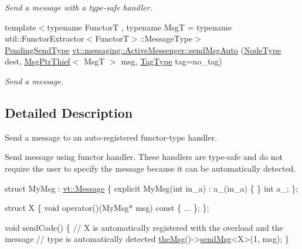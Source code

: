 \begin{DoxyCompactItemize}
\begin{DoxyCompactList}\small\item\em Send a message with a type-\/safe handler. \end{DoxyCompactList}\item 
{\footnotesize template$<$typename FunctorT , typename MsgT  = typename util\+::\+Functor\+Extractor$<$\+Functor\+T$>$\+::\+Message\+Type$>$ }\\\hyperlink{structvt_1_1messaging_1_1_active_messenger_a3626a6ca76d8ad4ec7c3b47a2c70d3a8}{Pending\+Send\+Type} \hyperlink{group__functorsend_ga902007cdc61f7c93e694b7c4c89d7ee1}{vt\+::messaging\+::\+Active\+Messenger\+::send\+Msg\+Auto} (\hyperlink{namespacevt_a866da9d0efc19c0a1ce79e9e492f47e2}{Node\+Type} dest, \hyperlink{structvt_1_1messaging_1_1_msg_ptr_thief}{Msg\+Ptr\+Thief}$<$ MsgT $>$ msg, \hyperlink{namespacevt_a84ab281dae04a52a4b243d6bf62d0e52}{Tag\+Type} tag=no\+\_\+tag)
\begin{DoxyCompactList}\small\item\em Send a message. \end{DoxyCompactList}\end{DoxyCompactItemize}


\subsection{Detailed Description}
Send a message to an auto-\/registered functor-\/type handler. 

Send message using functor handler. These handlers are type-\/safe and do not require the user to specify the message because it can be automatically detected.


\begin{DoxyCode}
\textcolor{keyword}{struct }MyMsg : \hyperlink{structvt_1_1messaging_1_1_active_msg}{vt::Message} \{
  \textcolor{keyword}{explicit} MyMsg(\textcolor{keywordtype}{int} in\_a) : a\_(in\_a) \{ \}
  \textcolor{keywordtype}{int} a\_;
\};

\textcolor{keyword}{struct }X \{
  \textcolor{keywordtype}{void} operator()(MyMsg* msg)\textcolor{keyword}{ const }\{ ... \};
\};

\textcolor{keywordtype}{void} sendCode() \{
  \textcolor{comment}{// X is automatically registered with the overload and the message}
  \textcolor{comment}{// type is automatically detected}
  \hyperlink{namespacevt_aeafd31f866aeb4dc6fc2f6ee97136350}{theMsg}()->\hyperlink{group__preregister_ga0162a39473e7f9b490a79a7983d949ac}{sendMsg}<X>(1, msg);
\}
\end{DoxyCode}
 

